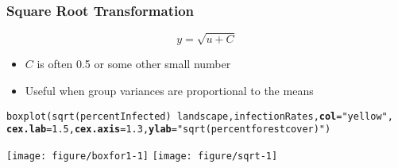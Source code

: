 \documentclass[color=usenames,dvipsnames]{beamer}\usepackage[]{graphicx}\usepackage[]{color}
\makeatletter
\newcommand{\hlnum}[1]{\textcolor[rgb]{0.69,0.494,0}{#1}}%
\newcommand{\hlstr}[1]{\textcolor[rgb]{0.749,0.012,0.012}{#1}}%
\newcommand{\hlopt}[1]{\textcolor[rgb]{0,0,0}{#1}}%
\newcommand{\hlstd}[1]{\textcolor[rgb]{0,0,0}{#1}}%
\newcommand{\hlkwc}[1]{\textcolor[rgb]{0,0,0}{\textbf{#1}}}%
\newcommand{\hlkwd}[1]{\textcolor[rgb]{0.004,0.004,0.506}{#1}}%
\newenvironment{kframe}{%
 \def\at@end@of@kframe{}%
 \ifinner\ifhmode%
  \def\at@end@of@kframe{\end{minipage}}%
  \begin{minipage}{\columnwidth}%
 \fi\fi%
 \def\FrameCommand##1{\hskip\@totalleftmargin \hskip-\fboxsep
 \colorbox{shadecolor}{##1}\hskip-\fboxsep
     \hskip-\linewidth \hskip-\@totalleftmargin \hskip\columnwidth}%
 \MakeFramed {\advance\hsize-\width
   \@totalleftmargin\z@ \linewidth\hsize
   \@setminipage}}%
 {\par\unskip\endMakeFramed%
 \at@end@of@kframe}
\newenvironment{knitrout}{}{} %
\makeatother
\begin{document}
\begin{frame}[fragile]
  \frametitle{Square Root Transformation}
  \small
  \[
  y = \sqrt{u + C}
  \]
  \vspace{-5mm}
  \begin{itemize}%
    \small
    \item $C$ is often 0.5 or some other small number
    \item Useful when group variances are proportional to the means
  \end{itemize}
  \pause
\begin{knitrout}\scriptsize
{}\color{fgcolor}\begin{kframe}
\begin{alltt}
\hlkwd{boxplot}\hlstd{(}\hlkwd{sqrt}\hlstd{(percentInfected)}\hlopt{~}\hlstd{landscape, infectionRates,} \hlkwc{col}\hlstd{=}\hlstr{"yellow"}\hlstd{,}
        \hlkwc{cex.lab}\hlstd{=}\hlnum{1.5}\hlstd{,} \hlkwc{cex.axis}\hlstd{=}\hlnum{1.3}\hlstd{,} \hlkwc{ylab}\hlstd{=}\hlstr{"sqrt(percent forest cover)"}\hlstd{)}
\end{alltt}
\end{kframe}
\end{knitrout}
\texttt{[image: figure/boxfor1-1]} \hfill
\texttt{[image: figure/sqrt-1]} \\
\end{frame}



\end{document}
